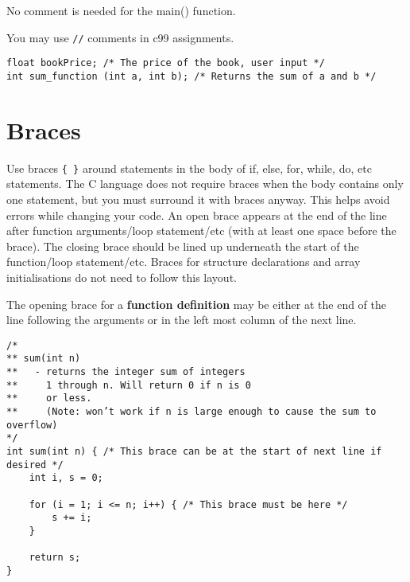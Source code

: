 \documentclass{article}
\begin{document}
No comment is needed for the main() function.

You may use \texttt{//} comments in c99 assignments.

\begin{lstlisting}
float bookPrice; /* The price of the book, user input */
int sum_function (int a, int b); /* Returns the sum of a and b */
\end{lstlisting}


\clearpage
\section{Braces}
Use braces \texttt{\{ \}} around statements in the body of if, else, for, while, do, etc statements.
The C language does not require braces when the body contains only one statement, but you must surround it with braces anyway. This helps avoid errors while changing your code.
An open brace appears at the end of the line after function arguments/loop statement/etc (with at least one space before the brace).
The closing brace should be lined up underneath the start of the function/loop statement/etc.
Braces for structure declarations and array initialisations do not need to follow this layout.

The opening brace for a \textbf{function definition} may be either at the end of the line following the arguments or in the left most column of the next line.

\begin{lstlisting}
/*
** sum(int n)
**   - returns the integer sum of integers
**     1 through n. Will return 0 if n is 0
**     or less.
**     (Note: won’t work if n is large enough to cause the sum to overflow)
*/
int sum(int n) { /* This brace can be at the start of next line if desired */
    int i, s = 0;

    for (i = 1; i <= n; i++) { /* This brace must be here */
        s += i;
    }

    return s;
}
\end{lstlisting}
\end{document}
